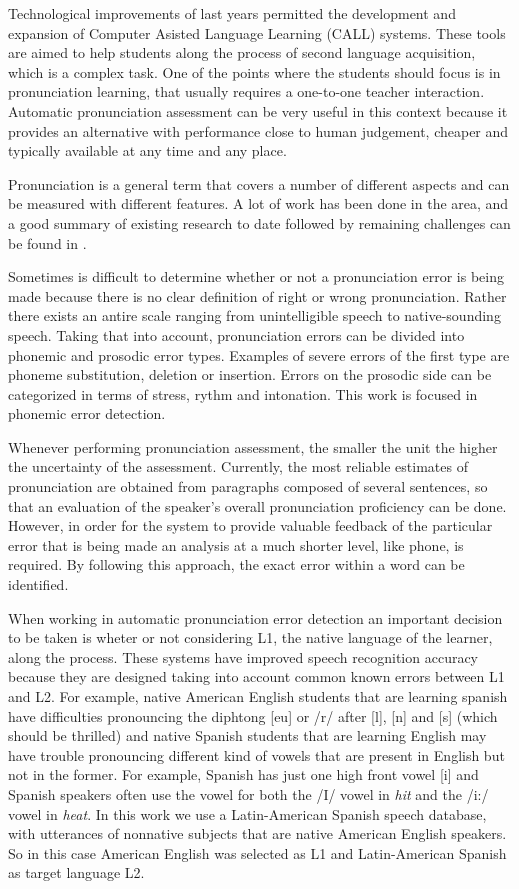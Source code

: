 Technological improvements of last years permitted the development and expansion of Computer 
Asisted Language Learning (CALL) systems. These tools are aimed to help students along the
process of second language acquisition, which is a complex task. One of the points where the
students should focus is in pronunciation learning, that usually requires a one-to-one teacher
interaction. Automatic pronunciation assessment can be very useful in this
context because it provides an alternative with performance close to human judgement, 
cheaper and typically available at any time and any place.

Pronunciation is a general term that covers a number of different aspects and can be measured
with different features. A lot of work has been done in the area, and a good summary of 
existing research to date followed by remaining challenges can be found in 
\cite{where_we_are_go}.

Sometimes is difficult to determine whether or not a 
pronunciation error is being made because there is no clear definition of right or wrong
pronunciation. Rather there exists an antire scale ranging from unintelligible speech to
native-sounding speech. Taking that into account, pronunciation errors can be divided into
phonemic and prosodic error types. Examples of severe errors of the first type are
phoneme substitution, deletion or insertion. Errors on the prosodic side can be
categorized in terms of stress, rythm and intonation. This work is focused in phonemic
error detection.

Whenever performing pronunciation assessment, the smaller the unit the higher the
uncertainty of the assessment. Currently, the most reliable estimates of pronunciation 
are obtained from paragraphs composed of several sentences, so that an evaluation of the 
speaker's overall pronunciation proficiency can be done. However, in order for the system
to provide valuable feedback of the particular error that is being made an analysis at a
much shorter level, like phone, is required. By following this approach, the exact error within
a word can be identified.

When working in automatic pronunciation error detection an important decision to be taken is
wheter or not considering L1, the native language of the learner, along the process. These
systems have improved speech recognition accuracy because they are designed 
taking into account common known errors between L1 and L2. For example, native American English 
students that are learning spanish have difficulties pronouncing the diphtong [eu] or 
/r/ after [l], [n] and [s] (which should be thrilled) and native Spanish students 
that are learning English may have trouble pronouncing 
different kind of vowels that are present in English
but not in the former. For example, Spanish has just one high front vowel [i] 
and Spanish speakers often use the vowel for both the /I/ vowel in \textit{hit} and 
the /i:/ vowel in \textit{heat}. In this work we use a Latin-American Spanish speech 
database, with utterances of nonnative subjects that are native American English speakers.
So in this case American English was selected as L1 and Latin-American Spanish as target
language L2.

